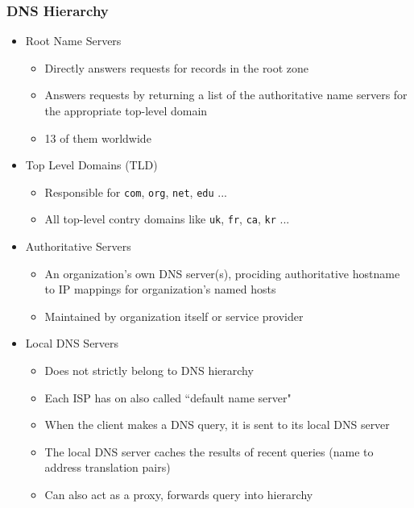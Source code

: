 \subsubsection{DNS Hierarchy}
\begin{itemize}
	\item Root Name Servers
	\begin{itemize}
		\item Directly answers requests for records in the root zone
		\item Answers requests by returning a list of the authoritative name servers for the appropriate top-level domain
		\item 13 of them worldwide
	\end{itemize}
	\item Top Level Domains (TLD)
	\begin{itemize}
		\item Responsible for \texttt{com}, \texttt{org}, \texttt{net}, \texttt{edu} ...
		\item All top-level contry domains like \texttt{uk}, \texttt{fr}, \texttt{ca}, \texttt{kr} ...
	\end{itemize}
	\item Authoritative Servers
	\begin{itemize}
		\item An organization's own DNS server(s), prociding authoritative hostname to IP mappings for organization's named hosts
		\item Maintained by organization itself or service provider
	\end{itemize}
	\item Local DNS Servers
	\begin{itemize}
		\item Does not strictly belong to DNS hierarchy
		\item Each ISP has on also called ``default name server"
		\item When the client makes a DNS query, it is sent to its local DNS server
		\item The local DNS server caches the results of recent queries (name to address translation pairs)
		\item Can also act as a proxy, forwards query into hierarchy
	\end{itemize}
\end{itemize}

